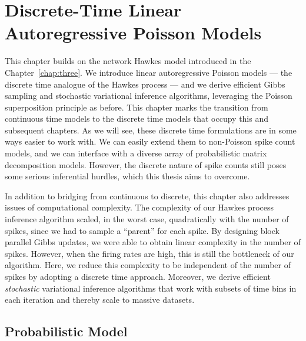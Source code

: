 \chapter{Discrete-Time Linear Autoregressive Poisson Models}
\label{chap:four}

This chapter builds on the network Hawkes model introduced in
the Chapter~\ref{chap:three}. We introduce linear autoregressive
Poisson models --- the discrete time analogue of the Hawkes process
--- and we derive efficient Gibbs sampling and stochastic variational
inference algorithms, leveraging the Poisson superposition principle as
before. This chapter marks the transition from continuous time models to
the discrete time models that occupy this and subsequent chapters. As
we will see, these discrete time formulations are in some ways easier
to work with. We can easily extend them to non-Poisson spike count
models, and we can interface with a diverse array of probabilistic
matrix decomposition models. However, the discrete nature of spike
counts still poses some serious inferential hurdles, which this thesis
aims to overcome.

In addition to bridging from continuous to discrete, this chapter also
addresses issues of computational complexity. The complexity of our
Hawkes process inference algorithm scaled, in the worst case,
quadratically with the number of spikes, since we had to sample a
``parent'' for each spike.  By designing block parallel Gibbs updates,
we were able to obtain linear complexity in the number of
spikes. However, when the firing rates are high, this is still the
bottleneck of our algorithm. Here, we reduce this complexity to be
independent of the number of spikes by adopting a discrete time
approach.  Moreover, we derive efficient \emph{stochastic} variational
inference algorithms \citep{Hoffman-2013} that work with subsets of
time bins in each iteration and thereby scale to massive datasets.


\section{Probabilistic Model}

